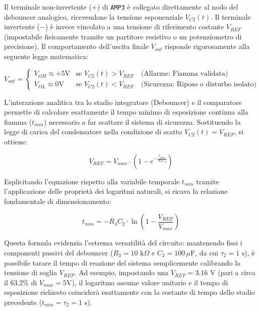 \documentclass[12pt,a4paper]{article}
\begin{document}
        Il terminale non-invertente ($+$) di \texttt{AMP3} è collegato direttamente al nodo del debouncer analogico, ricevendone la tensione esponenziale $V_{C2}(t)$. Il terminale invertente
        ($-$) è invece vincolato a una tensione di riferimento costante $V_{REF}$ (impostabile fisicamente tramite un partitore resistivo o un potenziometro di precisione). Il comportamento 
        dell'uscita finale $V_{out}$ risponde rigorosamente alla seguente legge matematica:
        
        \begin{equation}
            V_{out} = 
            \begin{cases} 
            V_{OH} \approx +5\text{V} & \text{se } V_{C2}(t) > V_{REF} \quad \text{(Allarme: Fiamma validata)} \\ 
            V_{OL} \approx 0\text{V} & \text{se } V_{C2}(t) < V_{REF} \quad \text{(Sicurezza: Riposo o disturbo isolato)} 
            \end{cases}
        \end{equation}

        L'interazione analitica tra lo stadio integratore (Debouncer) e il comparatore permette di calcolare esattamente il tempo minimo di esposizione continua alla fiamma ($t_{min}$)
        necessario a far scattare il sistema di sicurezza. Sostituendo la legge di carica del condensatore nella condizione di scatto $V_{C2}(t) = V_{REF}$, si ottiene:

        \begin{equation}
            V_{REF} = V_{max} \cdot \left(1 - e^{-\frac{t_{min}}{R_3 C_2}}\right)
        \end{equation}

        Esplicitando l'equazione rispetto alla variabile temporale $t_{min}$ tramite l'applicazione delle proprietà dei logaritmi naturali, si ricava la relazione fondamentale di dimensionamento:
        
        \begin{equation}
            \boxed{t_{min} = -R_3 C_2 \cdot \ln\left(1 - \frac{V_{REF}}{V_{max}}\right)}
        \end{equation}

        Questa formula evidenzia l'estrema versatilità del circuito: mantenendo fissi i componenti passivi del debouncer ($R_3 = 10\text{ k}\Omega$ e $C_2 = 100\,\mu\text{F}$, da cui $\tau_2 = 1\text{ s}$), 
        è possibile tarare il tempo di reazione del sistema semplicemente calibrando la tensione di soglia $V_{REF}$. Ad esempio, impostando una $V_{REF} = 3.16\text{ V}$ (pari a circa il $63.2\%$ di 
        $V_{max} = 5\text{V}$), il logaritmo assume valore unitario e il tempo di esposizione richiesto coinciderà esattamente con la costante di tempo dello stadio precedente ($t_{min} = \tau_2 = 1\text{ s}$). 
\end{document}
